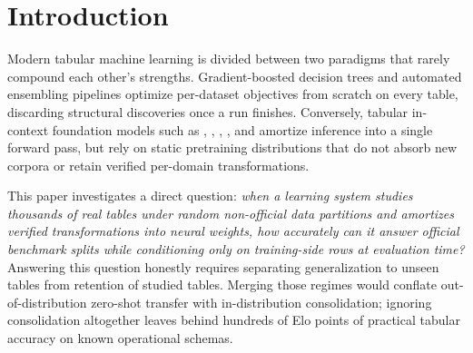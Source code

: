 \section{Introduction}
\label{sec:intro}

Modern tabular machine learning is divided between two paradigms that rarely compound each other's strengths. Gradient-boosted decision trees \citep{chen2016xgboost,ke2017lightgbm,prokhorenkova2018catboost} and automated ensembling pipelines \citep{feurer2015autosklearn,erickson2025tabarena} optimize per-dataset objectives from scratch on every table, discarding structural discoveries once a run finishes. Conversely, tabular in-context foundation models such as  \citep{hollmann2025tabpfn},  \citep{qu2025tabicl},  \citep{zhang2026limix2}, , and  amortize inference into a single forward pass, but rely on static pretraining distributions that do not absorb new corpora or retain verified per-domain transformations.

This paper investigates a direct question: \emph{when a learning system studies thousands of real tables under random non-official data partitions and amortizes verified transformations into neural weights, how accurately can it answer official benchmark splits while conditioning only on training-side rows at evaluation time?} Answering this question honestly requires separating generalization to unseen tables from retention of studied tables. Merging those regimes would conflate out-of-distribution zero-shot transfer with in-distribution consolidation; ignoring consolidation altogether leaves behind hundreds of Elo points of practical tabular accuracy on known operational schemas.

